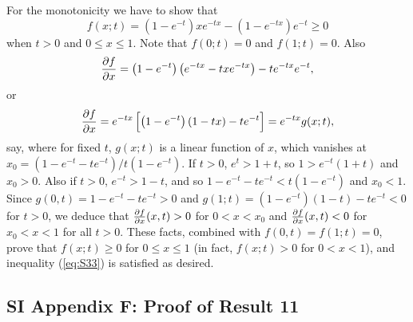 \documentclass[9pt, a4paper]{extarticle}
\begin{document}
\noindent For the monotonicity we have to show that
  \begin{equation} \label{eq:S33}
  f(x;t) =\left(1-e^{-t}\right)xe^{-tx} -\left(1 -e^{-tx}\right)e^{-t} \ge 0
  \end{equation}
  when $t>0$ and $0\le x\le 1$. Note that $f(0;t)=0$ and $f(1;t)=0$. Also
  \begin{equation}
	{\partial f\over\partial x} =\left(1-e^{-t}\right)\left(e^{-tx}-txe^{-tx}\right) -te^{-tx}e^{-t},
  \end{equation}
  or
  \begin{equation}
  {\partial f\over\partial x} =e^{-tx}\left[\left(1-e^{-t}\right)\left(1-tx\right) -te^{-t}\right] =e^{-tx}g(x;t),
  \end{equation}
 say, where for fixed $t$, $g(x;t)$ is a linear function of $x$, which vanishes at $x_0 =(1-e^{-t} -te^{-t})/t(1-e^{-t})$. If $t>0$, $e^t >1+t$, so $1>e^{-t}(1+t)$ and $x_0>0$. Also if $t>0$, $e^{-t}>1-t$, and so $1-e^{-t} -te^{-t} <t(1-e^{-t})$ and $x_0<1$. Since $g(0,t) =1 -e^{-t} -te^{-t} >0$ and $g(1;t) =(1-e^{-t})(1-t) -te^{-t} <0$ for $t>0$, we deduce that ${\partial f\over\partial x}(x,t)>0$ for $ 0<x<x_0$ and ${\partial f\over\partial x}(x,t)<0$ for $x_0<x<1$ for all $t>0$. These facts, combined with $f(0,t) =f(1;t) =0$, prove that $f(x;t)\ge 0$ for $0\le x\le 1$ (in fact, $f(x;t)>0$ for $0<x<1$), and inequality (\ref{eq:S33}) is satisfied as desired.

\subsection*{SI Appendix F: Proof of Result 11}
\end{document}
